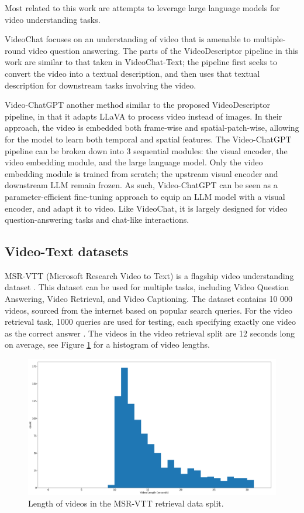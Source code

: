 Most related to this work are attempts to leverage large language models for video understanding tasks.

VideoChat \cite{videochat} focuses on an understanding of video that is amenable to multiple-round video question answering.
The parts of the VideoDescriptor pipeline  in this work are similar to that taken in VideoChat-Text; 
the pipeline first seeks to convert the video into a textual description, and then uses that textual description for downstream tasks involving the video.

Video-ChatGPT \cite{videochatgpt} another method similar to the proposed VideoDescriptor pipeline, in that it adapts LLaVA to process video instead of images.
In their approach, the video is embedded both frame-wise and spatial-patch-wise, allowing for the model to learn both temporal and spatial features.
The Video-ChatGPT pipeline can be broken down into 3 sequential modules: the visual encoder, the video embedding module, and the large language model.
Only the video embedding module is trained from scratch; the upstream visual encoder and downstream LLM remain frozen.
As such, Video-ChatGPT can be seen as a parameter-efficient fine-tuning approach to equip an LLM model with a visual encoder, and adapt it to video.
Like VideoChat, it is largely designed for video question-answering tasks and chat-like interactions.


\subsection{Video-Text datasets}
MSR-VTT (Microsoft Research Video to Text) is a flagship video understanding dataset \cite{msr-vtt}.
This dataset can be used for multiple tasks, including Video Question Answering, Video Retrieval, and Video Captioning.
The dataset contains 10 000 videos, sourced from the internet based on popular search queries.
For the video retrieval task, 1000 queries are used for testing, each specifying exactly one video as the correct answer \cite{jsfusion}.
The videos in the video retrieval split are 12 seconds long on average, see Figure \ref{fig:length_histogram} for a histogram of video lengths.

\begin{figure}
      \centering
      \includegraphics[width=\textwidth]{figures/msr-vtt-length-histogram.png}
      \caption{Length of videos in the MSR-VTT retrieval data split.}
      \label{fig:length_histogram}
\end{figure}

